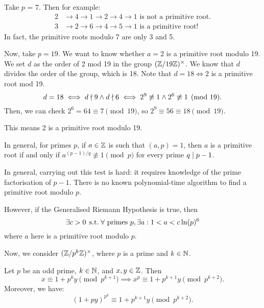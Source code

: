\documentclass{article}
\begin{document}
\begin{example}
	Take $p$ = 7. Then for example:
	\begin{align*}
		2 &\to 4 \to 1 \to 2 \to 4 \to 1 \text{ is not a primitive root.} \\ 
		3 &\to 2 \to 6 \to 4 \to 5 \to 1 \text{ is a primitive root!} 
	\end{align*}
	In fact, the primitive roots modulo 7 are only 3 and 5.
	
	Now, take $p = 19$. We want to know whether $a = 2$ is a primitive root modulo 19. We set $d$ as the order of 2 mod 19 in the group $(\mathbb{Z}/19\mathbb{Z})^\times$. We know that $d$ divides the order of the group, which is 18. Note that $d = 18 \iff 2$ is a primitive root mod 19.
	\[
	d = 18 \iff d \nmid 9 \land d \nmid 6 \iff 2^9 \not\equiv 1 \land 2^6 \not\equiv 1 \pmod{19}.
	\]
	Then, we can check $2^6 = 64 \equiv 7 \pmod{19}$, so $2^9 \equiv 56 \equiv 18 \pmod{19}$.
	
	This means 2 is a primitive root modulo 19.
\end{example}

\begin{corollary}
    In general, for primes $p$, if $a \in \mathbb{Z}$ is such that $(a, p) = 1$, then $a$ is a primitive root if and only if $a^{(p-1)/q} \not\equiv 1 \pmod{p}$ for every prime $q \mid p-1$.
\end{corollary}

\begin{remark}
	In general, carrying out this test is hard: it requires knowledge of the prime factorisation of $p-1$.
	There is no known polynomial-time algorithm to find a primitive root modulo $p$.
	
	However, if the Generalised Riemann Hypothesis is true, then
	\[
	\exists c > 0 \mathrel{\, \text{s.t.}} \forall \text{ primes } p, \exists a: 1 < a < c \ln (p)^6
	\]
	where $a$ here is a primitive root modulo $p$.
\end{remark}

Now, we consider $(\mathbb{Z}/p^k\mathbb{Z})^\times$, where $p$ is a prime and $k \in \mathbb{N}$.
\begin{proposition}
	\label{buildup-to-cyclic}
    Let $p$ be an odd prime, $k \in \mathbb{N}$, and $x, y \in \mathbb{Z}$. Then
    \[
	x \equiv 1 + p^k y \pmod{p^{k+1}}
	\implies
	x^p \equiv 1 + p^{k+1} y \pmod{p^{k+2}}.
	\]
	Moreover, we have:
	\[
	(1 + py)^{p^k} \equiv 1 + p^{k+1} y \pmod{p^{k+2}}.
	\]
\end{proposition}
\end{document}
